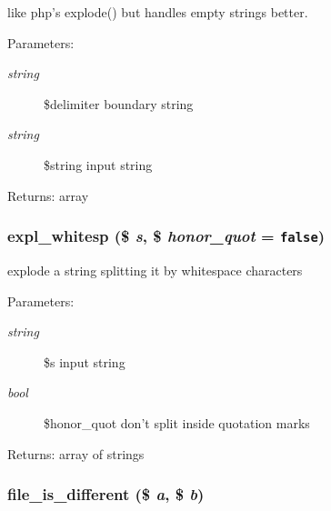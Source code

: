 like php's explode() but handles empty strings better. \begin{Desc}
\item[Parameters:]
\begin{description}
\item[{\em string}]\$delimiter boundary string \item[{\em string}]\$string input string \end{description}
\end{Desc}
\begin{Desc}
\item[Returns:]array \end{Desc}
\hypertarget{util_8inc_8php_1d2500a5e237e59956b03cbea845c95a}{
\subsubsection[{expl\_\-whitesp}]{\setlength{\rightskip}{0pt plus 5cm}expl\_\-whitesp (\$ {\em s}, \/  \$ {\em honor\_\-quot} = {\tt false})}}
\label{util_8inc_8php_1d2500a5e237e59956b03cbea845c95a}


explode a string splitting it by whitespace characters

\begin{Desc}
\item[Parameters:]
\begin{description}
\item[{\em string}]\$s input string \item[{\em bool}]\$honor\_\-quot don't split inside quotation marks \end{description}
\end{Desc}
\begin{Desc}
\item[Returns:]array of strings \end{Desc}
\hypertarget{util_8inc_8php_9c9a81ec9dba8b2870cbb365f8139866}{
\subsubsection[{file\_\-is\_\-different}]{\setlength{\rightskip}{0pt plus 5cm}file\_\-is\_\-different (\$ {\em a}, \/  \$ {\em b})}}
\label{util_8inc_8php_9c9a81ec9dba8b2870cbb365f8139866}


